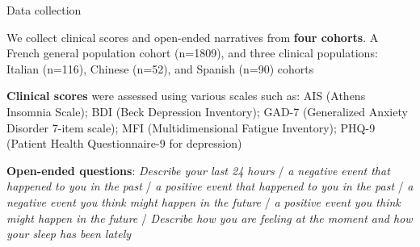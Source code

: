 \documentclass[10pt]{beamer}
\begin{document}
\begin{frame}{Data collection}

We collect clinical scores and open-ended narratives from \textbf{four cohorts}. A French general population cohort (n=1809), and three clinical populations: Italian (n=116), Chinese (n=52), and Spanish (n=90) cohorts%

\vspace{0.5cm}
\pause

\textbf{Clinical scores} were assessed using various scales such as: AIS (Athens Insomnia Scale); BDI (Beck Depression Inventory); GAD-7 (Generalized Anxiety Disorder 7-item scale); MFI (Multidimensional Fatigue Inventory); PHQ-9 (Patient Health Questionnaire-9 for depression)

\vspace{0.5cm}
\pause

\textbf{Open-ended questions}: \textit{Describe your last 24 hours} / \textit{a negative event that happened to you in the past} / \textit{a positive event that happened to you in the past} / \textit{a negative event you think might happen in the future} / \textit{a positive event you think might happen in the future} / \textit{Describe how you are feeling at the moment and how your sleep has been lately}

\end{frame}
\end{document}
